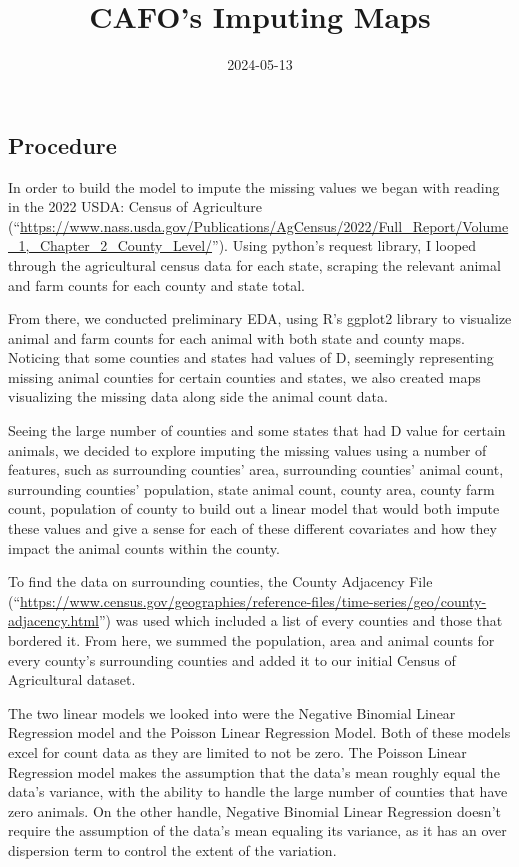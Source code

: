 \documentclass[
]{article}
\title{CAFO's Imputing Maps}
\author{}
\date{\vspace{-2.5em}2024-05-13}
\begin{document}
\maketitle

\subsection{Procedure}\label{procedure}

In order to build the model to impute the missing values we began with
reading in the 2022 USDA: Census of Agriculture
(``\url{https://www.nass.usda.gov/Publications/AgCensus/2022/Full_Report/Volume_1,_Chapter_2_County_Level/}'').
Using python's request library, I looped through the agricultural census
data for each state, scraping the relevant animal and farm counts for
each county and state total.

From there, we conducted preliminary EDA, using R's ggplot2 library to
visualize animal and farm counts for each animal with both state and
county maps. Noticing that some counties and states had values of D,
seemingly representing missing animal counties for certain counties and
states, we also created maps visualizing the missing data along side the
animal count data.

Seeing the large number of counties and some states that had D value for
certain animals, we decided to explore imputing the missing values using
a number of features, such as surrounding counties' area, surrounding
counties' animal count, surrounding counties' population, state animal
count, county area, county farm count, population of county to build out
a linear model that would both impute these values and give a sense for
each of these different covariates and how they impact the animal counts
within the county.

To find the data on surrounding counties, the County Adjacency File
(``\url{https://www.census.gov/geographies/reference-files/time-series/geo/county-adjacency.html}'')
was used which included a list of every counties and those that bordered
it. From here, we summed the population, area and animal counts for
every county's surrounding counties and added it to our initial Census
of Agricultural dataset.

The two linear models we looked into were the Negative Binomial Linear
Regression model and the Poisson Linear Regression Model. Both of these
models excel for count data as they are limited to not be zero. The
Poisson Linear Regression model makes the assumption that the data's
mean roughly equal the data's variance, with the ability to handle the
large number of counties that have zero animals. On the other handle,
Negative Binomial Linear Regression doesn't require the assumption of
the data's mean equaling its variance, as it has an over dispersion term
to control the extent of the variation.
\end{document}
